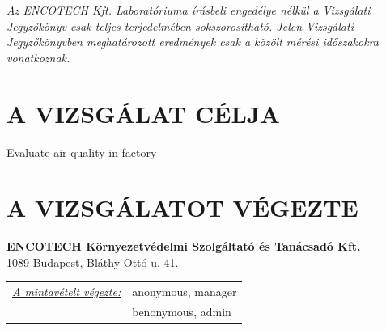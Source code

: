 \documentclass[a4paper,12pt]{article}
\begin{document}
	\begin{center}
		{\scriptsize 
			\textit{
				Az ENCOTECH Kft. Laboratóriuma írásbeli engedélye nélkül a Vizsgálati Jegyzőkönyv csak teljes terjedelmében sokszorosítható. 
				Jelen Vizsgálati Jegyzőkönyvben meghatározott eredmények csak a közölt mérési időszakokra vonatkoznak.
		}}  
	\end{center}
	
	\newpage
	

	\tableofcontents
	

	\newpage  %
	\pagestyle{report}
	
	
	\section{A VIZSGÁLAT CÉLJA}
		\begin{adjustwidth}{1cm}{0cm}
		Evaluate air quality in factory
		\end{adjustwidth}
	
	
	\section{A VIZSGÁLATOT VÉGEZTE}
		\begin{adjustwidth}{1cm}{0cm}
			\noindent
			\textbf{ENCOTECH Környezetvédelmi Szolgáltató és Tanácsadó Kft.} \\
			1089 Budapest, Bláthy Ottó u. 41.
			
			\vspace{1.0em} %
			
			\noindent
			\begin{tabular}{ p{5.5cm} p{8cm} } 
				\textit{\underline{A mintavételt végezte:}} & anonymous, manager \\ & benonymous, admin \\ 
			\end{tabular}
		\end{adjustwidth}
	
\end{document}

